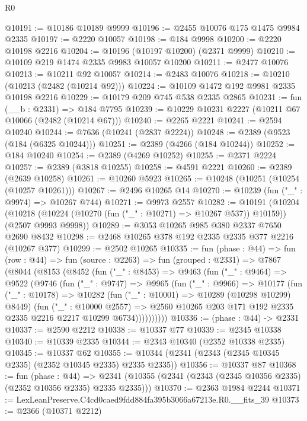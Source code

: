 \begin{lexlean}{R0}
\begin{coremodule}
@10191 := @10186 @10189 @9999
@10196 := @2455 @10076 @175 @1475 @9984 @2335
@10197 := @2220 @10057
@10198 := @184 @9998
@10200 := @2220 @10198 @2216
@10204 := @10196 (@10197 @10200) (@2371 @9999)
@10210 := @10109 @219 @1474 @2335 @9983 @10057 @10200
@10211 := @2477 @10076
@10213 := @10211 @92 @10057
@10214 := @2483 @10076
@10218 := @10210 (@10213 (@2482 (@10214 @92)))
@10224 := @10109 @1472 @192 @9981 @2335 @10198 @2216
@10229 := @10179 @209 @745 @538 @2335 @2865
@10231 := fun (__b : @2331) => @184 @7795
@10239 := @10229 @10231 @2227 (@10211 @67 @10066 (@2482 (@10214 @67)))
@10240 := @2265 @2221
@10241 := @2594 @10240
@10244 := @7636 (@10241 (@2837 @2224))
@10248 := @2389 (@9523 (@184 (@6325 @10244)))
@10251 := @2389 (@4266 (@184 @10244))
@10252 := @184 @10240
@10254 := @2389 (@4269 @10252)
@10255 := @2371 @2224
@10257 := @2389 (@3818 @10255)
@10258 := @4591 @2221
@10260 := @2389 (@2639 @10258)
@10261 := @10260 @5923
@10265 := @10248 (@10251 (@10254 (@10257 @10261)))
@10267 := @2496 @10265 @14
@10270 := @10239 (fun ("_" : @9974) => @10267 @744)
@10271 := @9973 @2557
@10282 := @10191
    (@10204
      (@10218 (@10224 (@10270 (fun ("_" : @10271) => @10267 @537)) @10159))
      (@2507 @9993 @9998))
@10289 := @3053 @10265 @985 @380 @2337 @7650 @2690 @8432
@10298 := @2468 @10265 @378 @192 @2335 @2335 @377 @2216 (@10267 @377)
@10299 := @2502 @10265
@10335 := fun (phase : @44) =>
  fun (row : @44) =>
  fun (source : @2263) =>
  fun (grouped : @2331) =>
  @7867
    (@8044
      (@8153
        (@8452
          (fun ("_" : @8453) =>
          @9463
            (fun ("_" : @9464) =>
            @9522
              (@9746
                (fun ("_" : @9747) =>
                @9965
                  (fun ("_" : @9966) =>
                  @10177
                    (fun ("_" : @10178) =>
                    @10282
                      (fun ("_" : @10001) => @10289 (@10298 @10299) @8449)
                      (fun ("_" : @10000 @2557) =>
                      @2560 @10265 @203 @171 @192 @2335 @2335 @2216 @2217 @10299 @6734))))))))))
@10336 := (phase : @44) -> @2331
@10337 := @2590 @2212
@10338 := @10337 @77
@10339 := @2345 @10338
@10340 := @10339 @2335
@10344 := @2343 @10340 (@2352 @10338 @2335)
@10345 := @10337 @62
@10355 := @10344 (@2341 (@2343 (@2345 @10345 @2335) (@2352 @10345 @2335) @2335 @2335))
@10356 := @10337 @87
@10368 := fun (phase : @44) =>
  @2341 (@10355 (@2341 (@2343 (@2345 @10356 @2335) (@2352 @10356 @2335) @2335 @2335)))
@10370 := @2363 @1984 @2244
@10371 := LexLeanPreserve.C4cd0caed9fdd884fa395b3066a67213e.R0.__fits_39
@10373 := @2366 (@10371 @2212)

\end{coremodule}
\end{lexlean}

